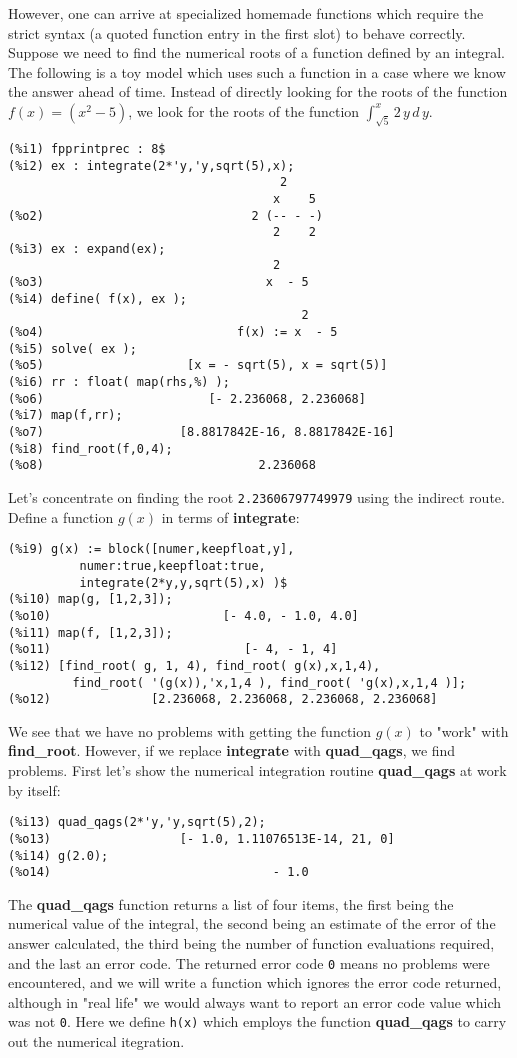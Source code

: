 \documentclass[12pt]{article}
\begin{document}
However, one can arrive at specialized homemade functions which require the strict
  syntax (a quoted function entry in the first slot) to behave correctly.
Suppose we need to find the numerical roots of a function defined by an integral.
The following is a toy model which uses such a function in a case where we know
  the answer ahead of time.
Instead of directly looking for the roots of the function
  $f(x)=(x^{2} - 5)$, we look for the roots of the function
  $\int_{\sqrt{5}}^{x} 2\,y\,d\,y$.
\small
\begin{verbatim}
(%i1) fpprintprec : 8$
(%i2) ex : integrate(2*'y,'y,sqrt(5),x);
                                      2
                                     x    5
(%o2)                             2 (-- - -)
                                     2    2
(%i3) ex : expand(ex);
                                     2
(%o3)                               x  - 5
(%i4) define( f(x), ex );
                                         2
(%o4)                           f(x) := x  - 5
(%i5) solve( ex );
(%o5)                    [x = - sqrt(5), x = sqrt(5)]
(%i6) rr : float( map(rhs,%) );
(%o6)                       [- 2.236068, 2.236068]
(%i7) map(f,rr);
(%o7)                   [8.8817842E-16, 8.8817842E-16]
(%i8) find_root(f,0,4);
(%o8)                              2.236068
\end{verbatim}
\normalsize
Let's concentrate on finding the root \verb|2.23606797749979| using the indirect route.
Define a function $g(x)$ in terms of \textbf{integrate}:
\small
\begin{verbatim}
(%i9) g(x) := block([numer,keepfloat,y],
          numer:true,keepfloat:true,
          integrate(2*y,y,sqrt(5),x) )$
(%i10) map(g, [1,2,3]);
(%o10)                        [- 4.0, - 1.0, 4.0]
(%i11) map(f, [1,2,3]);
(%o11)                           [- 4, - 1, 4]
(%i12) [find_root( g, 1, 4), find_root( g(x),x,1,4),
         find_root( '(g(x)),'x,1,4 ), find_root( 'g(x),x,1,4 )];
(%o12)              [2.236068, 2.236068, 2.236068, 2.236068]
\end{verbatim}
\normalsize
We see that we have no problems with getting the function $g(x)$ to "work"
  with \textbf{find\_root}.
However, if we replace \textbf{integrate} with \textbf{quad\_qags}, we find
  problems.
First let's show the numerical integration routine \textbf{quad\_qags} at work
  by itself:
\small
\begin{verbatim}
(%i13) quad_qags(2*'y,'y,sqrt(5),2);
(%o13)                  [- 1.0, 1.11076513E-14, 21, 0]
(%i14) g(2.0);
(%o14)                               - 1.0
\end{verbatim}
\normalsize
The \textbf{quad\_qags} function returns a list of four items, the
  first being the numerical value of the integral, the second being
  an estimate of the error of the answer calculated, the third being the
  number of function evaluations required, and the last  an error code.
The returned error code \verb|0| means no problems were encountered, and we
  will write a function which ignores the error code returned, although
  in "real life" we would always want to report an error code value which
  was not \verb|0|.
\newpage
Here we define \verb|h(x)| which employs the function \textbf{quad\_qags}
  to carry out the numerical itegration.
  
\end{document}
